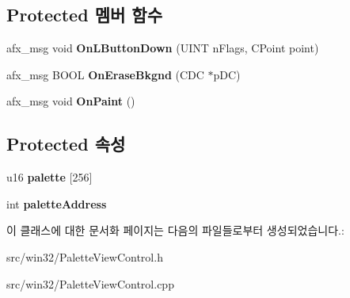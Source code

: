 \subsection*{Protected 멤버 함수}
\begin{DoxyCompactItemize}
\item 
\mbox{\label{class_palette_view_control_a766a44e9b018fc6c87f81f3c0fdd6c6e}} 
afx\+\_\+msg void {\bfseries On\+L\+Button\+Down} (U\+I\+NT n\+Flags, C\+Point point)
\item 
\mbox{\label{class_palette_view_control_ac2086b2ba7161f3adb5ac76484f77cc9}} 
afx\+\_\+msg B\+O\+OL {\bfseries On\+Erase\+Bkgnd} (C\+DC $\ast$p\+DC)
\item 
\mbox{\label{class_palette_view_control_ab68c1927e30e1b35b207d6884ef9822d}} 
afx\+\_\+msg void {\bfseries On\+Paint} ()
\end{DoxyCompactItemize}
\subsection*{Protected 속성}
\begin{DoxyCompactItemize}
\item 
\mbox{\label{class_palette_view_control_a1a5ce1812cf6c8d26889f4eb03d1d4ec}} 
u16 {\bfseries palette} \mbox{[}256\mbox{]}
\item 
\mbox{\label{class_palette_view_control_a53b2efd4174e06a68e545608e458947b}} 
int {\bfseries palette\+Address}
\end{DoxyCompactItemize}


이 클래스에 대한 문서화 페이지는 다음의 파일들로부터 생성되었습니다.\+:\begin{DoxyCompactItemize}
\item 
src/win32/Palette\+View\+Control.\+h\item 
src/win32/Palette\+View\+Control.\+cpp\end{DoxyCompactItemize}
